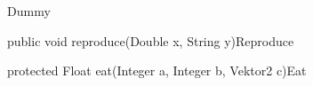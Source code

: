 \begin{absclass}{Dummy}
    \begin{methods}
        \begin{method}{public void reproduce(Double x, String y)}{Reproduce}
            \begin{parameters}
            \end{parameters}
        \end{method}
        \begin{method}{protected Float eat(Integer a, Integer b, Vektor2 c)}{Eat}
            \begin{parameters}
            \end{parameters}
        \end{method}
    \end{methods}
\end{absclass}

\newpage

\newpage

\newpage

\newpage


